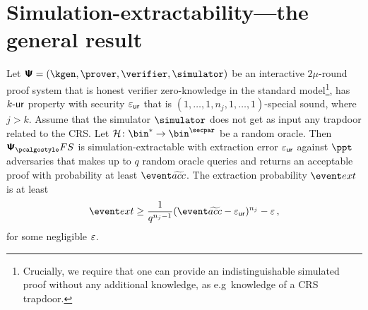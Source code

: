 \let\accentvec\vec \documentclass[runningheads,10pt]{llncs}
\begin{document}
\section{Simulation-extractability---the general result}

\begin{theorem}
	\label{thm:se}
	Let $\ps = (\kgen, \prover, \verifier, \simulator)$ be an interactive $2
	\mu$-round proof system that is honest verifier zero-knowledge in the
	standard model\footnote{Crucially, we require that one can provide an
			indistinguishable simulated proof without any additional knowledge, as
	e.g~knowledge of a CRS trapdoor.}, has ${k\text{-}\mathsf{ur}}$ property with security $\varepsilon_{\mathsf{ur}}$ that is $(1, \ldots, 1, n_j, 1, \ldots, 1)$-special sound, where $j > k$.
	Assume that the simulator $\simulator$ does not get as input any trapdoor related to the CRS.
	Let $\ro\colon \bin^{*} \to \bin^{\secpar}$ be a random oracle. 
	Then $\psfs$ is simulation-extractable with extraction error $\varepsilon_{\mathsf{ur}}$ against $\ppt$ adversaries that makes up to $q$ random oracle queries and returns an acceptable proof with probability at least $\waccProb$. 
	The extraction probability $\extProb$ is at least
	\[
		\extProb \geq \frac{1}{q^{n_j - 1}} (\waccProb - \epsur)^{n_j} -\eps\,,
	\]
	for some negligible $\varepsilon$.	
\end{theorem}
\end{document}
